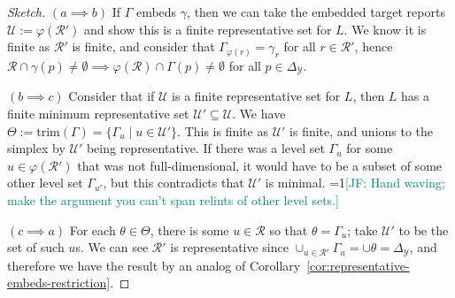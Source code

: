 \documentclass[12pt]{article}
\newcommand{\Comments}{1}
\newcommand{\mynote}[2]{\ifnum\Comments=1\textcolor{#1}{#2}\fi}
\newcommand{\jessie}[1]{\mynote{teal}{[JF: #1]}}
\newcommand{\simplex}{\Delta_\Y}
\newcommand{\R}{\mathcal{R}}
\newcommand{\U}{\mathcal{U}}
\newcommand{\Y}{\mathcal{Y}}
\newcommand{\trim}{\mathrm{trim}}
\begin{document}
\begin{proof}[Sketch]
  $(a \implies b)$
  If $\Gamma$ embeds $\gamma$, then we can take the embedded target reports $\U := \varphi(\R')$ and show this is a finite representative set for $L$.
  We know it is finite as $\R'$ is finite, and consider that $\Gamma_{\varphi(r)} = \gamma_r$ for all $r \in \R'$, hence $\R \cap \gamma(p) \neq \emptyset \implies \varphi(\R) \cap \Gamma(p) \neq \emptyset$ for all $p \in \simplex$.	
  
  $(b \implies c)$
  Consider that if $\U$ is a finite representative set for $L$, then $L$ has a finite minimum representative set $\U' \subseteq \U$.
  We have $\Theta := \trim(\Gamma) = \{\Gamma_u \mid u \in \U'\}$.
  This is finite as $\U'$ is finite, and unions to the simplex by $\U'$ being representative.
  If there was a level set $\Gamma_u$ for some $u \in \varphi(\R')$ that was not full-dimensional, it would have to be a subset of some other level set $\Gamma_{u'}$, but this contradicts that $\U'$ is minimal. \jessie{Hand waving; make the argument you can't span relints of other level sets.}
  
  $(c \implies a)$ 
  For each $\theta \in \Theta$, there is some $u \in \R$ so that $\theta = \Gamma_u$; take $\U'$ to be the set of such $u$s.
  We can see $\R'$ is representative since $\cup_{u \in \R'} \Gamma_u = \cup \theta = \simplex$, and therefore we have the result by an analog of Corollary~\ref{cor:representative-embeds-restriction}.
  

\end{proof}
\end{document}
